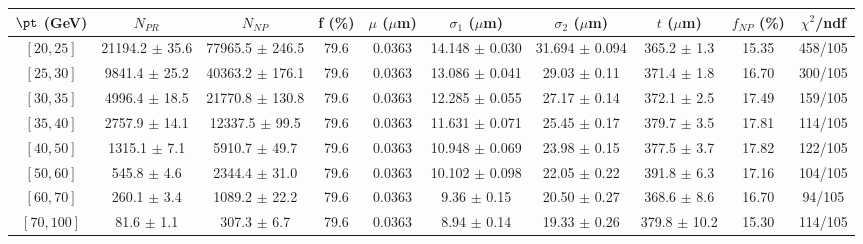 \begin{tabular}{c||c|c|c|c|c|c|c||c|c}
$\pt$ (GeV) & $N_{PR}$ & $N_{NP}$ & f (\%) & $\mu$ ($\mu$m) & $\sigma_1$ ($\mu$m) & $\sigma_2$ ($\mu$m)  & $t$ ($\mu$m) & $f_{NP}$ (\%) & $\chi^2$/ndf \\
\hline
$[20, 25]$ & 21194.2 $\pm$ 35.6 & 77965.5 $\pm$ 246.5 & 79.6 & 0.0363 & 14.148 $\pm$ 0.030 & 31.694 $\pm$ 0.094 & 365.2 $\pm$ 1.3 & 15.35 & 458/105\\
$[25, 30]$ & 9841.4 $\pm$ 25.2 & 40363.2 $\pm$ 176.1 & 79.6 & 0.0363 & 13.086 $\pm$ 0.041 & 29.03 $\pm$ 0.11 & 371.4 $\pm$ 1.8 & 16.70 & 300/105\\
$[30, 35]$ & 4996.4 $\pm$ 18.5 & 21770.8 $\pm$ 130.8 & 79.6 & 0.0363 & 12.285 $\pm$ 0.055 & 27.17 $\pm$ 0.14 & 372.1 $\pm$ 2.5 & 17.49 & 159/105\\
$[35, 40]$ & 2757.9 $\pm$ 14.1 & 12337.5 $\pm$ 99.5 & 79.6 & 0.0363 & 11.631 $\pm$ 0.071 & 25.45 $\pm$ 0.17 & 379.7 $\pm$ 3.5 & 17.81 & 114/105\\
$[40, 50]$ & 1315.1 $\pm$ 7.1 & 5910.7 $\pm$ 49.7 & 79.6 & 0.0363 & 10.948 $\pm$ 0.069 & 23.98 $\pm$ 0.15 & 377.5 $\pm$ 3.7 & 17.82 & 122/105\\
$[50, 60]$ & 545.8 $\pm$ 4.6 & 2344.4 $\pm$ 31.0 & 79.6 & 0.0363 & 10.102 $\pm$ 0.098 & 22.05 $\pm$ 0.22 & 391.8 $\pm$ 6.3 & 17.16 & 104/105\\
$[60, 70]$ & 260.1 $\pm$ 3.4 & 1089.2 $\pm$ 22.2 & 79.6 & 0.0363 & 9.36 $\pm$ 0.15 & 20.50 $\pm$ 0.27 & 368.6 $\pm$ 8.6 & 16.70 & 94/105\\
$[70, 100]$ & 81.6 $\pm$ 1.1 & 307.3 $\pm$ 6.7 & 79.6 & 0.0363 & 8.94 $\pm$ 0.14 & 19.33 $\pm$ 0.26 & 379.8 $\pm$ 10.2 & 15.30 & 114/105\\
\end{tabular}
